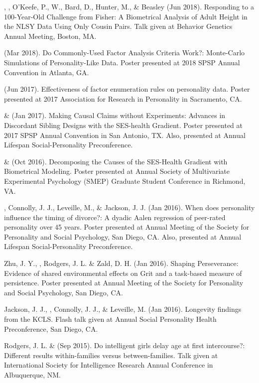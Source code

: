 \item\Joe, \meb, O'Keefe, P., W., Bard, D., Hunter, M., \& Beasley (Jun 2018). Responding to a 100-Year-Old Challenge from Fisher: A Biometrical Analysis of Adult Height in the NLSY Data Using Only Cousin Pairs. Talk given at Behavior Genetics Annual Meeting, Boston, MA. 

\item\meb (Mar 2018). Do Commonly-Used Factor Analysis Criteria Work?: Monte-Carlo Simulations of Personality-Like Data. Poster presented at 2018 SPSP Annual Convention in Atlanta, GA. 
\item\meb (Jun 2017). Effectiveness of factor enumeration rules on personality data. Poster presented at 2017 Association for Research in Personality in Sacramento, CA.
%
\item\meb \& \joe (Jan 2017). Making Causal Claims without Experiments: Advances in Discordant Sibling Designs with the SES-health Gradient. Poster presented at 2017 SPSP Annual Convention in San Antonio, TX. Also, presented at Annual Lifespan Social-Personality Preconference.
%
\item\meb \& \joe (Oct 2016). Decomposing the Causes of the SES-Health Gradient with Biometrical Modeling. Poster presented at Annual Society of Multivariate Experimental Psychology (SMEP) Graduate Student Conference in Richmond, VA.
%
\item \meb, Connolly, J. J., Leveille, M., \& Jackson, J. J. (Jan 2016). When does personality influence the timing of divorce?: A dyadic Aalen regression of peer-rated personality over 45 years. Poster presented at Annual Meeting of the Society for Personality and Social Psychology, San Diego, CA. Also, presented at Annual Lifespan Social-Personality Preconference.
%
\item Zhu, J. Y., \meb, Rodgers, J. L. \& Zald, D. H. (Jan 2016). Shaping Perseverance: Evidence of shared environmental effects on Grit and a task-based measure of persistence. Poster presented at Annual Meeting of the Society for Personality and Social Psychology, San Diego, CA.
\item Jackson, J. J., \meb, Connolly, J. J., \& Leveille, M. (Jan 2016). Longevity findings from the KCLS. Flash talk given at Annual Social Personality Health Preconference, San Diego, CA. %
%
\item Rodgers, J. L. \& \meb (Sep 2015). Do intelligent girls delay age at first intercourse?: Different results within-families versus between-families. Talk given at International Society for Intelligence Research Annual Conference in Albuquerque, NM.
